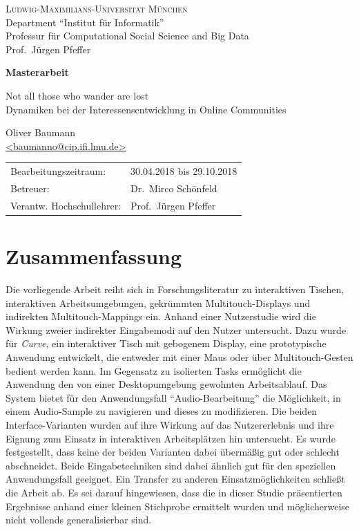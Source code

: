 \documentclass[11pt,a4paper,twoside]{article}
\title{}
\author{}
\date{}
\begin{document}
\pagestyle{empty} %

\begin{center}
\textsc{Ludwig-Maximilians-Universität München}\\
Department ``Institut für Informatik''\\
Professur für Computational Social Science and Big Data\\
Prof.\ Jürgen Pfeffer

\vspace{4.75cm}
{\large\textbf{Masterarbeit}}\vspace{.5cm}

{\Huge{}Not all those who wander are lost}\\\vspace{.5cm}
{\Large{}Dynamiken bei der Interessensentwicklung in Online Communities}\vspace{.75cm}

{\large Oliver Baumann}\\\href{mailto:baumanno@cip.ifi.lmu.de}{<baumanno@cip.ifi.lmu.de>}

\end{center}
\vfill

\begin{tabular}{ll}
Bearbeitungszeitraum: & 30.04.2018 bis 29.10.2018\\
Betreuer: & Dr.\ Mirco Schönfeld\\
Verantw. Hochschullehrer: & Prof.\ Jürgen Pfeffer
\end{tabular}


\clearpage
\section*{Zusammenfassung}

Die vorliegende Arbeit reiht sich in Forschungsliteratur zu interaktiven Tischen, interaktiven Arbeitsumgebungen,
gekrümmten Multitouch-Displays und indirekten Multitouch-Mappings ein. Anhand einer Nutzerstudie wird die Wirkung zweier indirekter
Eingabemodi auf den Nutzer untersucht. Dazu wurde für \emph{Curve}, ein interaktiver Tisch mit gebogenem Display,
eine prototypische Anwendung entwickelt, die entweder mit einer Maus oder über Multitouch-Gesten bedient werden kann.
Im Gegensatz zu isolierten Tasks ermöglicht die Anwendung den von einer Desktopumgebung gewohnten Arbeitsablauf. Das System
bietet für den Anwendungsfall "`Audio-Bearbeitung"' die Möglichkeit, in einem Audio-Sample zu navigieren und dieses
zu modifizieren. Die beiden Interface-Varianten wurden auf ihre Wirkung auf das Nutzererlebnis und ihre Eignung
zum Einsatz in interaktiven Arbeitsplätzen hin untersucht. Es wurde festgestellt, dass keine der beiden Varianten
dabei übermäßig gut oder schlecht abschneidet. Beide Eingabetechniken sind dabei ähnlich gut für den speziellen
Anwendungsfall geeignet. Ein Transfer zu anderen Einsatzmöglichkeiten schließt die Arbeit ab. Es sei darauf hingewiesen,
dass die in dieser Studie präsentierten Ergebnisse anhand einer kleinen Stichprobe ermittelt wurden und möglicherweise
nicht vollends generalisierbar sind.
\end{document}
